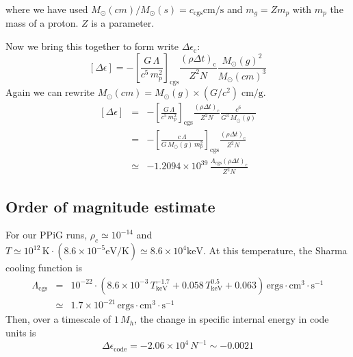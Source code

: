 where we have used $M_\odot(cm)/M_\odot(s) = c_\mathrm{cgs} \mathrm{cm/s}$ and $m_g = Z m_p$ with $m_p$ the mass of 
a proton.  $Z$ is a parameter.

Now we bring this together to form write $\Delta \epsilon_\mathrm{c}$:
\begin{equation}
	\left[\Delta \epsilon \right] = -\left[ \frac{G\,\Lambda}{c^5\,m_p^2} \right]_\mathrm{cgs} 
		\frac{ \left( \rho \Delta t \right)_\mathrm{c}}{Z^2 N} \frac{M_\odot(g)^2}{M_\odot(cm)^3}
\end{equation}
Again we can rewrite $M_\odot(cm) = M_\odot(g) \times (G/c^2)\;\mathrm{cm/g}$.
\begin{subequations}
\begin{eqnarray}
	\left[\Delta \epsilon \right] &=& - \left[ \frac{G\,\Lambda}{c^5\,m_p^2} \right]_\mathrm{cgs} 
		\frac{ \left( \rho \Delta t \right)_\mathrm{c}}{Z^2 N} \frac{c^6}{G^3\,M_\odot(g)} \\
	&=& - \left[ \frac{c\,\Lambda}{G\,M_\odot(g)\,m_p^2} \right]_\mathrm{cgs} 
		\frac{ \left( \rho \Delta t \right)_\mathrm{c}}{Z^2 N} \\
	&\simeq& - 1.2094\times10^{39}\, \frac{ \Lambda_\mathrm{cgs} \left( \rho \Delta t \right)_\mathrm{c}}{Z^2 N}
\end{eqnarray}
\end{subequations}

\subsection{Order of magnitude estimate}
For our PPiG runs, $\rho_c \simeq 10^{-14}$ and $T\simeq10^{12}\,\mathrm{K} \cdot \left(8.6\times10^{-5} \mathrm{eV/K} \right)
\simeq 8.6\times10^4 \mathrm{keV}$. At this temperature, the Sharma cooling function is
\begin{subequations}
\begin{eqnarray}
	\Lambda_\mathrm{cgs} &=& 10^{-22} \cdot \left( 8.6\times10^{-3}\,T_\mathrm{keV}^{-1.7} + 0.058\,T_\mathrm{keV}^{0.5}+0.063\right)
		\,\mathrm{ergs\cdot cm^3\cdot s^{-1}} \\
	&\simeq& 1.7 \times 10^{-21} \,\mathrm{ergs\cdot cm^3\cdot s^{-1}}
\end{eqnarray}
\end{subequations}
Then, over a timescale of $1\,M_h$, the change in specific internal energy in code units is
\begin{equation}
	\Delta \epsilon_\mathrm{code} = -2.06\times10^4\, N^{-1} \sim -0.0021
\end{equation}


